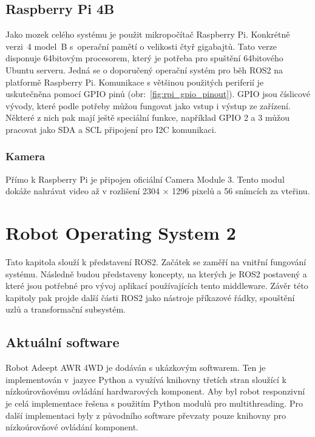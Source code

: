 \section{Raspberry Pi 4B}
Jako mozek celého systému je použit mikropočítač Raspberry Pi. Konkrétně verzi~4 model~B s~operační pamětí o velikosti čtyř gigabajtů. Tato verze disponuje 64bitovým procesorem, který je potřeba pro spuštění 64bitového Ubuntu serveru. Jedná se o doporučený operační systém pro běh ROS2 na platformě Raspberry Pi.
Komunikace s většinou použitých periferií je uskutečněna pomocí GPIO pinů (obr:~\ref{fig:rpi_gpio_pinout}). GPIO jsou číslicové vývody, které podle potřeby můžou fungovat jako vstup i výstup ze zařízení. Některé z nich pak mají ještě speciální funkce, například GPIO 2 a 3 můžou pracovat jako SDA a SCL připojení pro I2C komunikaci. \cite{rpi_documentation}

\subsection*{Kamera}
Přímo k Raspberry Pi je připojen oficiální Camera Module 3. Tento modul dokáže nahrávat video až v rozlišení 2304 × 1296 pixelů a 56 snímcích za vteřinu. \cite{rpi_documentation}

\chapter{Robot Operating System 2}
Tato kapitola slouží k představení ROS2. Začátek se zaměří na vnitřní fungování systému. Následně budou představeny koncepty, na kterých je ROS2 postavený a které jsou potřebné pro vývoj aplikací používajících tento middleware. Závěr této kapitoly pak projde další části ROS2 jako nástroje příkazové řádky, spouštění uzlů a transformační subsystém.

\section{Aktuální software}
Robot Adeept AWR 4WD je dodáván s ukázkovým softwarem. Ten je implementován v~jazyce Python a využívá knihovny třetích stran sloužící k nízkoúrovňovému ovládání hardwarových komponent. Aby byl robot responzivní je celá implementace řešena s použitím Python modulů pro multithreading. Pro další implementaci byly z původního software převzaty pouze knihovny pro nízkoúrovňové ovládání komponent.


